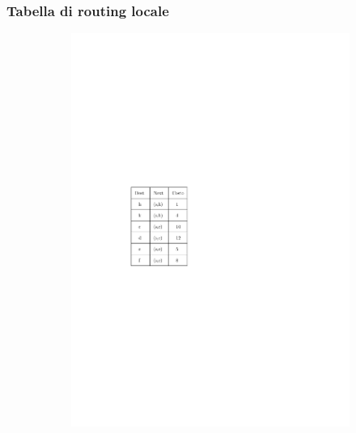 \documentclass[10pt,xcolor=dvipsnames]{beamer}
\begin{document}
\begin{frame}
	\frametitle{Tabella di routing locale}
	
	\begin{figure}[h]
	\centering
		\begin{subfigure}[b]{0.35\textwidth}
		\includegraphics[scale=0.8]{routing_table_local.pdf}
		\end{subfigure}
		\begin{subfigure}[b]{0.6\textwidth}

\end{subfigure}
\end{figure}
\end{frame}
\end{document}
